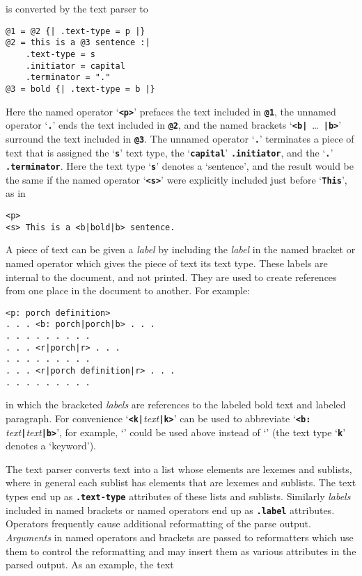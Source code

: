 \documentclass[12pt]{article}
\newcommand{\TT}[1]{{\tt \bfseries #1}}
\newcommand{\ttkey}[1]{{\tt \bfseries #1}}
\newcommand{\ttdkey}[1]{{\tt \bfseries .#1}}
\newenvironment{indpar}[1][0.3in]%
	{\begin{list}{}%
		     {\setlength{\itemsep}{0in}%
		      \setlength{\topsep}{0in}%
		      \setlength{\parsep}{1ex}%
		      \setlength{\labelwidth}{#1}%
		      \setlength{\leftmargin}{#1}%
		      \addtolength{\leftmargin}{\labelsep}}%
	 \item}%
	{\end{list}}
\begin{document}
is converted by the text parser to

\begin{indpar}\begin{verbatim}
@1 = @2 {| .text-type = p |}
@2 = this is a @3 sentence :|
    .text-type = s
    .initiator = capital 
    .terminator = "."
@3 = bold {| .text-type = b |}
\end{verbatim}\end{indpar}

Here the named operator `\TT{<p>}' prefaces the text included in \TT{@1},
the unnamed operator `\TT{.}' ends the text included in \TT{@2},
and the named brackets `\TT{<b|}~\ldots~\TT{|b>}' surround the text
included in \TT{@3}.  The unnamed operator `\TT{.}' terminates
a piece of text that is assigned the `\TT{s}' text type,
the `\TT{capital}' \TT{.initiator}, and
the `\TT{.}' \TT{.terminator}.  Here the text type `\TT{s}' denotes
a `sentence', and the result would be the same if
the named operator `\TT{<s>}' were explicitly included just before
`\TT{This}', as in

\begin{indpar}\begin{verbatim}
<p>
<s> This is a <b|bold|b> sentence.
\end{verbatim}\end{indpar}

A piece of text can be given a {\em label} by including the {\em label}
in the named bracket or named operator which gives the piece of text
its text type.
These labels are internal to the document, and not printed.
They are used to create references from one place in the document to
another.  For example:

\begin{indpar}\begin{verbatim}
<p: porch definition>
. . . <b: porch|porch|b> . . .
. . . . . . . . .
. . . <r|porch|r> . . .
. . . . . . . . .
. . . <r|porch definition|r> . . .
. . . . . . . . .
\end{verbatim}\end{indpar}

in which the \TT{<r|  |r>} bracketed {\em labels} are references
to the labeled bold text and labeled paragraph.  For convenience
`\TT{<k|}{\em text}\TT{|k>}' can be used to abbreviate
`\TT{<b:} {\em text}\TT{|}{\em text}\TT{|b>}', for example,
`\TT{<k|porch|k>}' could be used above instead of
`\TT{<b: porch|porch|b>}' (the text type `\ttkey{k}'
denotes a `keyword').


The text parser converts text into a list whose elements are lexemes
and sublists, where in general each sublist has elements that are
lexemes and sublists.
The text types end up as \ttdkey{text-type}
attributes of these lists and sublists.
Similarly {\em labels} included in named brackets
or named operators end up as \ttdkey{label}
attributes.  Operators frequently cause additional reformatting
of the parse output.  {\em Arguments} in named operators and
brackets are passed to reformatters which use them to control
the reformatting and may insert them as various attributes in the
parsed output.  As an example, the text
\end{document}
